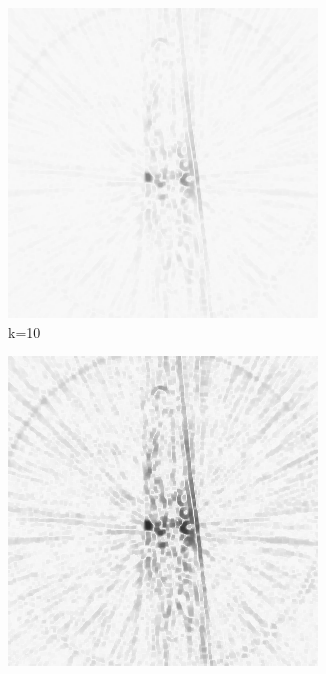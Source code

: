\documentclass[journal]{IEEEtran}
\begin{document}


\begin{figure}[h]
    \begin{subfigure}[b]{0.24\linewidth}
        \includegraphics[width=\textwidth]{../images/okra/2D_okra/weightsIm_10normalized.png}
        \caption{k=10}
     \end{subfigure}     
  \begin{subfigure}[b]{0.24\linewidth}
        \includegraphics[width=\textwidth]{../images/okra/2D_okra/weightsIm_50normalized.png}

\end{subfigure}
\end{figure}
\end{document}
